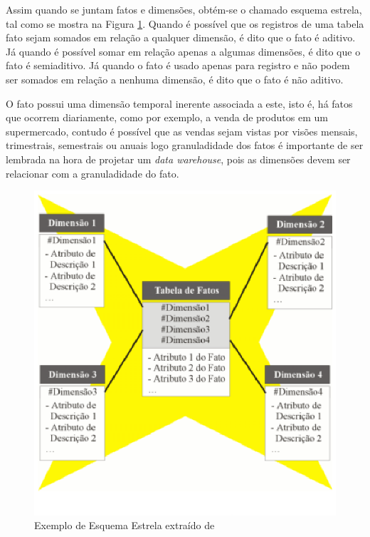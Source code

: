 Assim quando se juntam fatos e dimensões, obtém-se o chamado esquema estrela, tal como se mostra na Figura \ref{estrela}. Quando é possível que os registros de uma tabela fato sejam somados em relação a qualquer dimensão, é dito que o fato é aditivo. Já quando é possível somar em relação apenas a algumas dimensões, é dito que o fato é semiaditivo. Já quando o fato é usado apenas para registro e não podem ser somados em relação a nenhuma dimensão, é dito que o fato é não aditivo.

O fato possui uma dimensão temporal inerente associada a este, isto é, há fatos que ocorrem diariamente, como por exemplo, a venda de produtos em um supermercado, contudo é possível que as vendas sejam vistas por visões mensais, trimestrais, semestrais ou anuais logo granuladidade dos fatos é importante de ser lembrada na hora de projetar um \textit{data warehouse}, pois as dimensões devem ser relacionar com a granuladidade do fato.


\begin{figure}[h!]
\centering
\includegraphics[keepaspectratio=false,scale=1]{figuras/estrela.eps}
\caption{Exemplo de Esquema Estrela extraído de }
\label{estrela}
\end{figure}
\FloatBarrier

